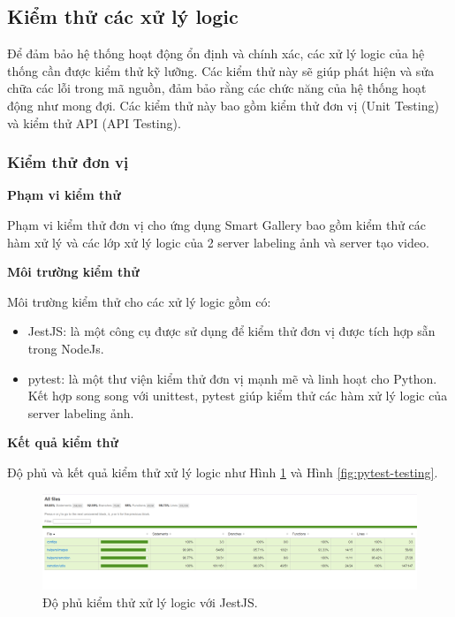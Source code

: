 \subsection{Kiểm thử các xử lý logic}

Để đảm bảo hệ thống hoạt động ổn định và chính xác, các xử lý logic của hệ thống cần được kiểm thử kỹ lưỡng. Các kiểm thử này sẽ giúp phát hiện và sửa chữa các lỗi trong mã nguồn, đảm bảo rằng các chức năng của hệ thống hoạt động như mong đợi. Các kiểm thử này bao gồm kiểm thử đơn vị (Unit Testing) và kiểm thử API (API Testing).
\subsubsection{Kiểm thử đơn vị}


\textbf{Phạm vi kiểm thử}

Phạm vi kiểm thử đơn vị cho ứng dụng Smart Gallery bao gồm kiểm thử các hàm xử lý và các lớp xử lý logic của 2 server labeling ảnh và server tạo video. 

\textbf{Môi trường kiểm thử}

Môi trường kiểm thử cho các xử lý logic gồm có: 
\begin{itemize}
    \item JestJS\cite{jestJS}: là một công cụ được sử
    dụng để kiểm thử đơn vị được tích hợp sẵn trong NodeJs.
    \item pytest\cite{pytest}: là một thư viện kiểm thử đơn vị mạnh mẽ và linh hoạt cho Python. Kết hợp song song với unittest\cite{unittest}, pytest giúp kiểm thử các hàm xử lý logic của server labeling ảnh.
\end{itemize}

\textbf{Kết quả kiểm thử}

Độ phủ và kết quả kiểm thử xử lý logic như Hình \ref{fig:jest-testing} và Hình \ref{fig:pytest-testing}.

\begin{figure}[H]
    \centering  
    \includegraphics[width=1\textwidth]{figures/c4/4-3/jest.png}
    \caption{Độ phủ kiểm thử xử lý logic với JestJS.}
    \label{fig:jest-testing}
\end{figure}

